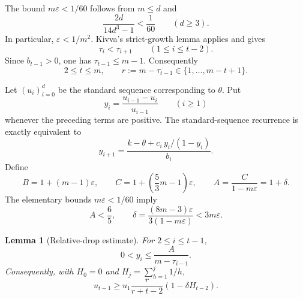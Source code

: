 \documentclass[11pt]{amsart}
\newtheorem{lemma}[theorem]{Lemma}
\theoremstyle{definition}
\newcommand{\eps}{\varepsilon}
\begin{document}
The bound $m\eps<1/60$ follows from $m\le d$ and
\[
 \frac{2d}{14d^3-1}<\frac1{60}
 \qquad(d\ge3).
\]
In particular, $\eps<1/m^2$.  Kivva's strict-growth lemma \cite[Lemma~4.2]{Kivva} applies and gives
\begin{equation}\label{eq:taugrowth}
 \tau_i<\tau_{i+1}\qquad(1\le i\le t-2).
\end{equation}
Since $b_{t-1}>0$, one has $\tau_{t-1}\le m-1$.  Consequently
\begin{equation}\label{eq:trange}
 2\le t\le m,
 \qquad
 r:=m-\tau_{t-1}\in\{1,\ldots,m-t+1\}.
\end{equation}

Let $(u_i)_{i=0}^{d}$ be the standard sequence corresponding to $\theta$.  Put
\[
 y_i=\frac{u_{i-1}-u_i}{u_{i-1}}
 \qquad(i\ge1)
\]
whenever the preceding terms are positive.  The standard-sequence recurrence is exactly equivalent to
\begin{equation}\label{eq:riccati}
 y_{i+1}=
 \frac{k-\theta+c_i\,y_i/(1-y_i)}{b_i}.
\end{equation}
Define
\begin{equation}\label{eq:ABC}
 B=1+(m-1)\eps,
 \qquad
 C=1+\left(\frac53m-1\right)\eps,
 \qquad
 A=\frac{C}{1-m\eps}=1+\delta.
\end{equation}
The elementary bounds $m\eps<1/60$ imply
\begin{equation}\label{eq:Adelta}
 A<\frac65,
 \qquad
 \delta=\frac{(8m-3)\eps}{3(1-m\eps)}<3m\eps.
\end{equation}

\begin{lemma}[Relative-drop estimate]\label{lem:drops}
For $2\le i\le t-1$,
\begin{equation}\label{eq:ybound}
 0<y_i\le\frac{A}{m-\tau_{i-1}}.
\end{equation}
Consequently, with $H_0=0$ and $H_j=\sum_{h=1}^{j}1/h$,
\begin{equation}\label{eq:ulower}
 u_{t-1}\ge
 u_1\frac{r}{r+t-2}\left(1-\delta H_{t-2}\right).
\end{equation}
\end{lemma}
\end{document}
